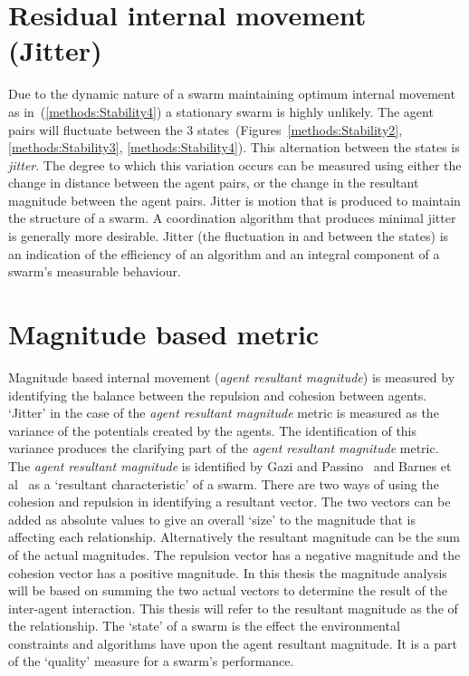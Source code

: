 \section{Residual internal movement (Jitter)}\label{metric:Jitter}
Due to the dynamic nature of a swarm maintaining optimum internal movement as in~(\autoref{methods:Stability4}) a stationary swarm is highly unlikely. The agent pairs will fluctuate between the 3 states~(Figures~\ref{methods:Stability2}, \ref{methods:Stability3}, \ref{methods:Stability4}). This alternation between the states is \textit{jitter}. The degree to which this variation occurs can be measured using either the change in distance between the agent pairs, or the change in the resultant magnitude between the agent pairs. Jitter is motion that is produced to maintain the structure of a swarm. A coordination algorithm that produces minimal jitter is generally more desirable. Jitter (the fluctuation in and between the states) is an indication of the efficiency of an algorithm and an integral component of a swarm's measurable behaviour.

\section{Magnitude based metric\label{section:MagnitudeDynamics}}
Magnitude based internal movement (\textit{agent resultant magnitude}) is measured by identifying the balance between the repulsion and cohesion between agents. `Jitter' in the case of the \textit{agent resultant magnitude} metric is measured as the variance of the potentials created by the agents. The identification of this variance produces the clarifying part of the \textit{agent resultant magnitude} metric.
The \textit{agent resultant magnitude} is identified by Gazi and Passino~\cite{GP:11} and Barnes et al~\cite{BFV:07} as a `resultant characteristic' of a swarm. There are two ways of using the cohesion and repulsion in identifying a resultant vector. The two vectors can be added as absolute values to give an overall `size' to the magnitude that is affecting each relationship. Alternatively the resultant magnitude can be the sum of the actual magnitudes. The repulsion vector has a negative magnitude and the cohesion vector has a positive magnitude. In this thesis the magnitude analysis will be based on summing the two actual vectors to determine the result of the inter-agent interaction. This thesis will refer to the resultant magnitude as the  of the relationship. The `state' of a swarm is the effect the environmental constraints and algorithms have upon the agent resultant magnitude. It is a part of the `quality' measure for a swarm's performance.


